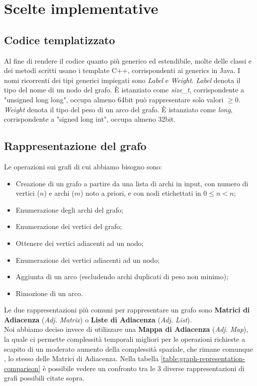 \section{Scelte implementative}
\label{cap:implementation-choices}

\subsection{Codice templatizzato}

Al fine di rendere il codice quanto più generico ed estendibile, molte delle classi e dei metodi scritti
usano i template C++, corrispondenti ai generics in Java.
I nomi ricorrenti dei tipi generici impiegati sono \textit{Label} e \textit{Weight}.
\textit{Label} denota il tipo del nome di un nodo del grafo. È istanziato come \textit{size\_t}, corrispondente a "unsigned long long", occupa almeno 64bit può rappresentare solo valori $\geq 0$.
\textit{Weight} denota il tipo del peso di un arco del grafo. È istanziato come \textit{long}, corrispondente a "signed long int",
occupa almeno 32bit.

\subsection{Rappresentazione del grafo}
\label{sub:graph-representation}

Le operazioni sui grafi di cui abbiamo bisogno sono:

\begin{itemize}
    \item Creazione di un grafo a partire da una lista di archi in input, con numero di vertici ($n$) e archi ($m$) noto a priori, e con nodi etichettati in $ 0 \leq n < n $;
    \item Enumerazione degli archi del grafo;
    \item Enumerazione dei vertici del grafo;
    \item Ottenere dei vertici adiacenti ad un nodo;
    \item Enumerazione dei vertici adiacenti ad un nodo;
    \item Aggiunta di un arco (escludendo archi duplicati di peso non minimo);
    \item Rimozione di un arco.
\end{itemize}

\noindent Le due rappresentazioni più comuni per rappresentare un grafo sono \textbf{Matrici di Adiacenza} (\textit{Adj. Matrix}) o \textbf{Liste di Adiacenza} (\textit{Adj. List}). \\
Noi abbiamo deciso invece di utilizzare una \textbf{Mappa di Adiacenza} (\textit{Adj. Map}), la quale ci permette complessità temporali migliori per le operazioni richieste a scapito di un moderato aumento della complessità spaziale, che rimane comunque \complexityNPlusM{}, lo stesso delle Matrici di Adiacenza. Nella tabella \ref{table:graph-representation-comparison} è possibile vedere un confronto tra le 3 diverse rappresentazioni di grafi possibili citate sopra. \\

